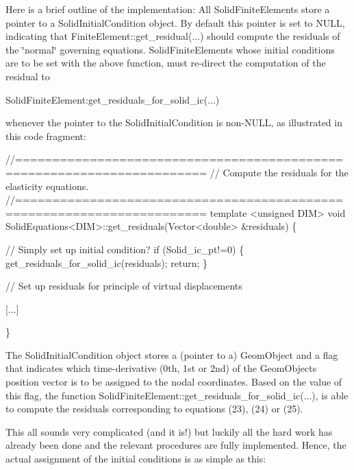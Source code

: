 Here is a brief outline of the implementation\+: All {\ttfamily Solid\+Finite\+Elements} store a pointer to a {\ttfamily Solid\+Initial\+Condition} object. By default this pointer is set to N\+U\+LL, indicating that {\ttfamily Finite\+Element\+::get\+\_\+residual}(...) should compute the residuals of the \char`\"{}normal\char`\"{} governing equations. {\ttfamily Solid\+Finite\+Elements} whose initial conditions are to be set with the above function, must re-\/direct the computation of the residual to 
\begin{DoxyCode}
SolidFiniteElement:get\_residuals\_for\_solid\_ic(...)
\end{DoxyCode}
 whenever the pointer to the {\ttfamily Solid\+Initial\+Condition} is non-\/\+N\+U\+LL, as illustrated in this code fragment\+:


\begin{DoxyCode}
\textcolor{comment}{//=======================================================================}
\textcolor{comment}{// Compute the residuals for the elasticity equations.}
\textcolor{comment}{//=======================================================================}
\textcolor{keyword}{template} <\textcolor{keywordtype}{unsigned} DIM>
 \textcolor{keywordtype}{void} SolidEquations<DIM>::get\_residuals(Vector<double> &residuals)
 \{
 
  \textcolor{comment}{// Simply set up initial condition?}
  \textcolor{keywordflow}{if} (Solid\_ic\_pt!=0)
   \{
    get\_residuals\_for\_solid\_ic(residuals);
    \textcolor{keywordflow}{return};
   \}

  \textcolor{comment}{// Set up residuals for principle of virtual displacements}

  [...]


  \}
\end{DoxyCode}


The {\ttfamily Solid\+Initial\+Condition} object stores a (pointer to a) {\ttfamily Geom\+Object} and a flag that indicates which time-\/derivative (0th, 1st or 2nd) of the {\ttfamily Geom\+Object\textquotesingle{}s} position vector is to be assigned to the nodal coordinates. Based on the value of this flag, the function {\ttfamily Solid\+Finite\+Element\+::get\+\_\+residuals\+\_\+for\+\_\+solid\+\_\+ic}(...), is able to compute the residuals corresponding to equations (23), (24) or (25).

This all sounds very complicated (and it is!) but luckily all the hard work has already been done and the relevant procedures are fully implemented. Hence, the actual assignment of the initial conditions is as simple as this\+:


